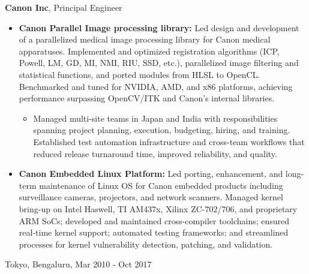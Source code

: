 \documentclass[10pt, letterpaper]{article}
\newenvironment{highlights}{
    \begin{itemize}[
        topsep=0.10 cm,
        parsep=0.10 cm,
        partopsep=0pt,
        itemsep=0pt,
        leftmargin=0.4 cm + 10pt
    ]
}{
    \end{itemize}
} %
\newenvironment{twocolentry}[2][]{
    \onecolentry
    \def\secondColumn{#2}
    \setcolumnwidth{\fill, 3.0 cm}
    \begin{paracol}{2}
}{
    \switchcolumn \raggedleft \secondColumn
    \end{paracol}
    \endonecolentry
} %
\begin{document}
        \vspace{0.2 cm}
        \begin{twocolentry}{
            Tokyo, Bengaluru, Mar 2010 - Oct 2017
        }
        \textbf{Canon Inc}, Principal Engineer
            \begin{highlights}
                  \item \textbf {Canon Parallel Image processing library:} Led design and development of a parallelized medical image processing library for Canon medical apparatuses. Implemented and optimized registration algorithms (ICP, Powell, LM, GD, MI, NMI, RIU, SSD, etc.), parallelized image filtering and statistical functions, and ported modules from HLSL to OpenCL. Benchmarked and tuned for NVIDIA, AMD, and x86 platforms, achieving performance surpassing OpenCV/ITK and Canon’s internal libraries.
                    \begin{itemize}
                        \item Managed multi-site teams in Japan and India with responsibilities spanning project planning, execution, budgeting, hiring, and training. Established test automation infrastructure and cross-team workflows that reduced release turnaround time, improved reliability, and quality.
                    \end{itemize}
    \item \textbf {Canon Embedded Linux Platform:} Led porting, enhancement, and long-term maintenance of Linux OS for Canon embedded products including surveillance cameras, projectors, and network scanners. Managed kernel bring-up on Intel Haswell, TI AM437x, Xilinx ZC-702/706, and proprietary ARM SoCs; developed and maintained cross-compiler toolchains; ensured real-time kernel support; automated testing frameworks; and streamlined processes for kernel vulnerability detection, patching, and validation.
            \end{highlights}
        \end{twocolentry}
\end{document}
